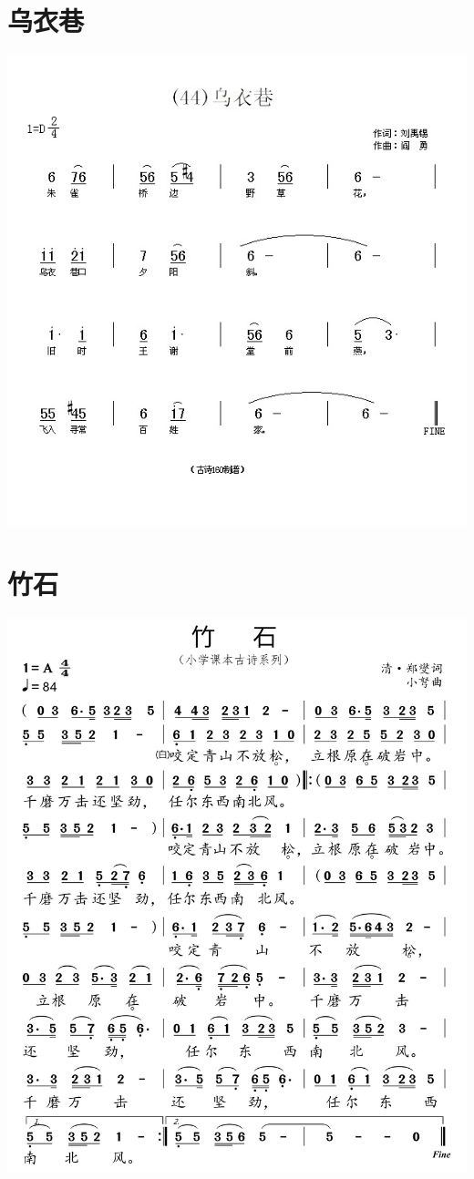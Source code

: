 \documentclass[cn,pad,twocol]{elegantbook}
\begin{document}
\section{乌衣巷}
    \includegraphics[width=\textwidth]{dongxiao/20200808-乌衣巷-刘禹锡.jpg}
\section{竹石}
    \includegraphics[width=\textwidth]{dongxiao/20200808-竹石-郑燮.jpg}
\end{document}
